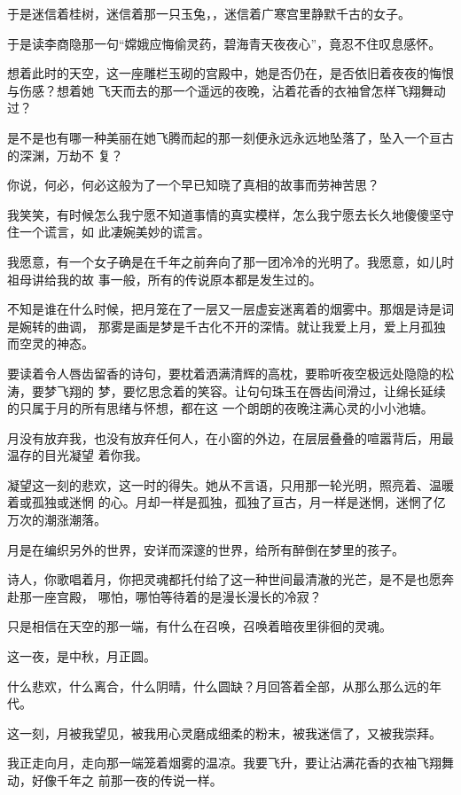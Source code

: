 		于是迷信着桂树，迷信着那一只玉兔，，迷信着广寒宫里静默千古的女子。

		于是读李商隐那一句“嫦娥应悔偷灵药，碧海青天夜夜心”，竟忍不住叹息感怀。

		想着此时的天空，这一座雕栏玉砌的宫殿中，她是否仍在，是否依旧着夜夜的悔恨与伤感？想着她
	飞天而去的那一个遥远的夜晚，沾着花香的衣袖曾怎样飞翔舞动过？

		是不是也有哪一种美丽在她飞腾而起的那一刻便永远永远地坠落了，坠入一个亘古的深渊，万劫不
	复？

		你说，何必，何必这般为了一个早已知晓了真相的故事而劳神苦思？

		我笑笑，有时候怎么我宁愿不知道事情的真实模样，怎么我宁愿去长久地傻傻坚守住一个谎言，如
	此凄婉美妙的谎言。

		我愿意，有一个女子确是在千年之前奔向了那一团冷冷的光明了。我愿意，如儿时祖母讲给我的故
	事一般，所有的传说原本都是发生过的。

		不知是谁在什么时候，把月笼在了一层又一层虚妄迷离着的烟雾中。那烟是诗是词是婉转的曲调，
	那雾是画是梦是千古化不开的深情。就让我爱上月，爱上月孤独而空灵的神态。

		要读着令人唇齿留香的诗句，要枕着洒满清辉的高枕，要聆听夜空极远处隐隐的松涛，要梦飞翔的
	梦，要忆思念着的笑容。让句句珠玉在唇齿间滑过，让绵长延续的只属于月的所有思绪与怀想，都在这
	一个朗朗的夜晚注满心灵的小小池塘。

		月没有放弃我，也没有放弃任何人，在小窗的外边，在层层叠叠的喧嚣背后，用最温存的目光凝望
	着你我。

		凝望这一刻的悲欢，这一时的得失。她从不言语，只用那一轮光明，照亮着、温暖着或孤独或迷惘
	的心。月却一样是孤独，孤独了亘古，月一样是迷惘，迷惘了亿万次的潮涨潮落。

		月是在编织另外的世界，安详而深邃的世界，给所有醉倒在梦里的孩子。

		诗人，你歌唱着月，你把灵魂都托付给了这一种世间最清澈的光芒，是不是也愿奔赴那一座宫殿，
	哪怕，哪怕等待着的是漫长漫长的冷寂？

		只是相信在天空的那一端，有什么在召唤，召唤着暗夜里徘徊的灵魂。

		这一夜，是中秋，月正圆。

		什么悲欢，什么离合，什么阴晴，什么圆缺？月回答着全部，从那么那么远的年代。

		这一刻，月被我望见，被我用心灵磨成细柔的粉末，被我迷信了，又被我崇拜。

		我正走向月，走向那一端笼着烟雾的温凉。我要飞升，要让沾满花香的衣袖飞翔舞动，好像千年之
	前那一夜的传说一样。

